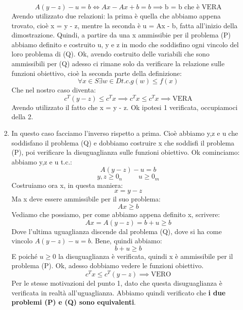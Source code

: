 \begin{enumerate}
    \begin{equation*}
        A(y - z) - u = b \Longleftrightarrow Ax - Ax + b = b \implies \text{b = b che è VERA}
    \end{equation*}
    Avendo utilizzato due relazioni: la prima è quella che abbiamo appena trovato, cioè x = y - z, mentre la seconda è u = Ax - b, fatta all'inizio della dimostrazione. Quindi, a partire da una x ammissibie per il problema (P) abbiamo definito e costruito u, y e z in modo che soddisfino ogni vincolo del loro problema di (Q). Ok, avendo costruito delle variabili che sono ammissibili per (Q) adesso ci rimane solo da verificare la relazione sulle funzioni obiettivo, cioè la seconda parte della definizione:
    \begin{equation*}
        \forall x \in S \exists w \in D t.c. g(w) \leq f(x)
    \end{equation*}
    Che nel nostro caso diventa:
    \begin{equation*}
        c^T(y - z) \leq c^Tx \implies c^Tx \leq c^Tx \implies \text{VERA}
    \end{equation*}
    Avendo utilizzato il fatto che x = y - z. Ok ipotesi 1 verificata, occupiamoci della 2.
    
    
    \item  In questo caso facciamo l'inverso rispetto a prima. Cioè abbiamo y,z e u che soddisfano il problema (Q) e dobbiamo costruire x che soddisfi il problema (P), poi verificare la disuguaglianza sulle funzioni obiettivo. Ok cominciamo: abbiamo y,z e u t.c.:
    \begin{equation*}
        A(y - z) - u = b
    \end{equation*}
    \begin{equation*}
        y,z \geq 0_n \hspace{1cm} u \geq 0_m
    \end{equation*}
    Costruiamo ora x, in questa maniera:
    \begin{equation*}
        x = y - z
    \end{equation*}
    Ma x deve essere ammissibile per il suo problema:
    \begin{equation*}
        Ax \geq b
    \end{equation*}
    Vediamo che possiamo, per come abbiamo appena definito x, scrivere:
    \begin{equation*}
        Ax = A(y - z) = b + u \geq b
    \end{equation*}
    Dove l'ultima uguaglianza discende dal problema (Q), dove si ha come vincolo $A(y - z) - u = b$. Bene, quindi abbiamo:
    \begin{equation*}
        b + u \geq b 
    \end{equation*}
    E poiché $u \geq 0$ la disuguaglianza è verificata, quindi x è ammissibile per il problema (P). Ok, adesso dobbiamo vedere le funzioni obiettivo.
    \begin{equation*}
        c^Tx \leq c^T(y-z) \implies \text{VERO}
    \end{equation*}
    Per le stesse motivazioni del punto 1, dato che questa disuguaglianza è verificata in realtà all'uguaglianza. Abbiamo quindi verificato che \textbf{i due problemi (P) e (Q) sono equivalenti}.
\end{enumerate}
